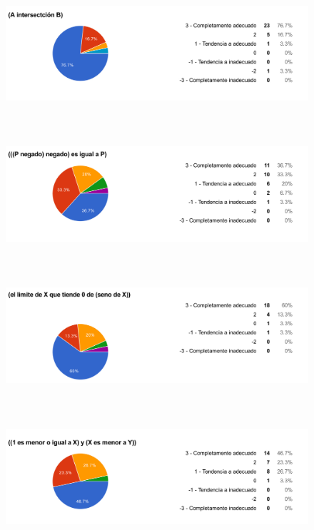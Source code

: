 \begin{figure}[H]
\centering
	\includegraphics[width=15cm, height=4.74cm]{Figures/hjudgement/r8}
	\caption[]{}
\label{fig:parsed_corpus}
\end{figure}

\begin{figure}[H]
\centering
	\includegraphics[width=15cm, height=4.74cm]{Figures/hjudgement/r9}
	\caption[]{}
\label{fig:parsed_corpus}
\end{figure}

\begin{figure}[H]
\centering
	\includegraphics[width=15cm, height=4.74cm]{Figures/hjudgement/r10}
	\caption[]{}
\label{fig:parsed_corpus}
\end{figure}

\begin{figure}[H]
\centering
	\includegraphics[width=15cm, height=4.74cm]{Figures/hjudgement/r11}
	\caption[]{}
\label{fig:parsed_corpus}
\end{figure}

